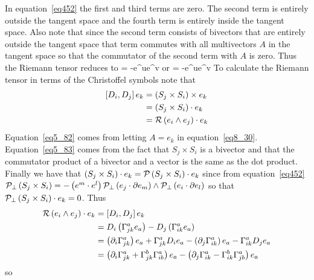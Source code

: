 In equation~\ref{eq452} the first and third terms are zero. The second term is entirely outside the tangent space  and the fourth term
is entirely inside the tangent space.  Also note that since the second term consists of bivectors that are entirely outside the tangent 
space that term commutes with all multivectors $A$ in the tangent space so that the commutator of the second term with $A$ is zero. Thus
the Riemann tensor reduces to
\be\label{eq454}
 = -e^{u}\w e^{v}
\ee 
or
\be\label{eq455}
 = -e^{u}\w e^{v}
\ee
To calculate the Riemann tensor in terms of the Christoffel symbols note that
\begin{align}
	\left [ {D_{i}},{D_{j}}\right ]e_{k} &= \left ( {S_{j}\times S_{i}} \right )\times e_{k}  \label{eq5_82} \\
	                         &= \left ( {S_{j}\times S_{i}} \right )\cdot e_{k}  \label{eq5_83} \\
	                         &= {\mathcal{R}}\left ( {e_{i}\wedge e_{j}} \right )\cdot e_{k} \label{eq5_84}
\end{align}
Equation~\ref{eq5_82} comes from letting $A = e_{k}$ in equation~\ref{eq8_30}. Equation~\ref{eq5_83} comes from
the fact that $S_{j}\times S_{i}$ is a bivector and that the commutator product of a bivector and a vector is the
same as the dot product.  Finally we have that $\left ( {S_{j}\times S_{i}} \right )\cdot e_{k} = {\mathcal{P}}\left ( {S_{j}\times S_{i}} \right )\cdot e_{k}$ 
since from equation~\ref{eq452} ${\mathcal{P}_{\perp}}\left ( {S_{j}\times S_{i}} \right ) = -\left ( {e^{m}\cdot e^{l}} \right ){\mathcal{P}_{\perp}}\left ( {e_{j}\cdot\partial e_{m}} \right )\wedge{\mathcal{P}_{\perp}}\left ( {e_{i}\cdot\partial e_{l}} \right )$
so that ${\mathcal{P}_{\perp}}\left ( {S_{j}\times S_{i}} \right )\cdot e_{k} = 0$. Thus
\begin{align}
{\mathcal{R}}\left ( {e_{i}\wedge e_{j}} \right )\cdot e_{k} &= \left [ {D_{i}},{D_{j}}\right ]e_{k} \nonumber \\
                                &= D_{i}\left ( {\Gamma_{jk}^{a}e_{a}} \right )-D_{j}\left ( {\Gamma_{ik}^{a}e_{a}} \right ) \nonumber \\
                                &= \left ( {\partial_{i}\Gamma_{jk}^{a}} \right ) e_{a}+\Gamma_{jk}^{a}D_{i}e_{a}
                                 -\left ( {\partial_{j}\Gamma_{ik}^{a}} \right ) e_{a}-\Gamma_{ik}^{a}D_{j}e_{a} \nonumber \\
                                &= \left ( {\partial_{i}\Gamma_{jk}^{a}+\Gamma_{jk}^{b}\Gamma_{ib}^{a}} \right ) e_{a} 
                                 -\left ( {\partial_{j}\Gamma_{ik}^{a}-\Gamma_{ik}^{b}\Gamma_{jb}^{a}} \right ) e_{a} 
\end{align}
so
